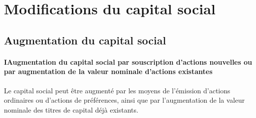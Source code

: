 \documentclass[a4paper,12pt]{report}
\begin{document}
\section{Modifications du capital social}
%
%
%
%
%
\subsection{Augmentation du capital social}

\paragraph{I\hspace{4mm}Augmentation du capital social par souscription d'actions nouvelles ou par augmentation de la valeur nominale d'actions existantes\\}

Le capital social peut être augmenté par les moyens de l'émission d'actions ordinaires ou d'actions de préférences, 
ainsi que par l'augmentation de la valeur nominale des titres de capital déjà existants.
\end{document}
